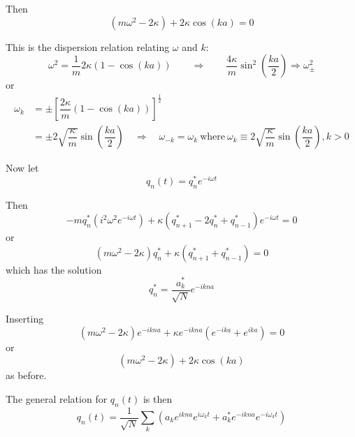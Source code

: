 \documentclass{article}
\begin{document}
\noindent Then
\begin{equation*}
    \left( m \omega^2 - 2 \kappa \right) + 2 \kappa \cos{(ka)} = 0
\end{equation*}

\noindent This is the dispersion relation relating $\omega$ and $k$:
\begin{equation*}
    \omega^2 = \dfrac{1}{m} 2 \kappa \left( 1 - \cos{(ka)} \right) \qquad \Longrightarrow \qquad \dfrac{ 4 \kappa }{m} \sin^2{\left(\dfrac{ k a }{2}\right)} \Rightarrow \omega_\pm^2
\end{equation*}
or
\begin{align*}
    \omega_k &= \pm {\left[ \dfrac{ 2 \kappa }{m} \left( 1 - \cos{(ka)} \right) \right]}^\frac{1}{2} \\
    &= \pm 2 \sqrt{\dfrac{\kappa}{m}} \sin{\left( \dfrac{ka}{2} \right)} \quad \Longrightarrow \quad \omega_{-k} = \omega_{k} ~ \mathrm{where} ~ \omega_k \equiv 2 \sqrt{\dfrac{\kappa}{m}} \sin{\left( \dfrac{ka}{2} \right)}, k>0
\end{align*}

\noindent Now let
\begin{equation*}
    q_n (t) = q_n^* e^{ -i \omega t }
\end{equation*}


\noindent Then
\begin{equation*}
    -m q_n^* \left( i^2 \omega^2 e^{ -i \omega t } \right) + \kappa \left( q_{n+1}^* - 2 q_n^* + q_{n-1}^* \right) e^{ -i \omega t } = 0
\end{equation*}
or
\begin{equation*}
    \left( m \omega^2 - 2 \kappa \right) q_n^* + \kappa \left( q_{n+1}^* + q_{n-1}^* \right) = 0
\end{equation*}
which has the solution
\begin{equation*}
    q_n^* = \dfrac{ a_k^* }{ \sqrt{N} } e^{ -i k n a }
\end{equation*}

\noindent Inserting
\begin{equation*}
    \left( m \omega^2 - 2 \kappa \right) e^{ -i k n a } + \kappa e^{ -i k n a } \left( e^{ -i k a } + e^{ i k a } \right) = 0
\end{equation*}
or
\begin{equation*}
    \left( m \omega^2 - 2 \kappa \right) + 2 \kappa \cos{(ka)}
\end{equation*}
as before.

\noindent The general relation for $q_n (t)$ is then
\begin{equation*}
    q_n (t) = \dfrac{1}{\sqrt{N}} \sum_k \left( a_k e^{ i k n a } e^{ i \omega_k t } + a_k^* e^{ -i k n a } e^{ -i \omega_k t } \right)
\end{equation*}
\end{document}
